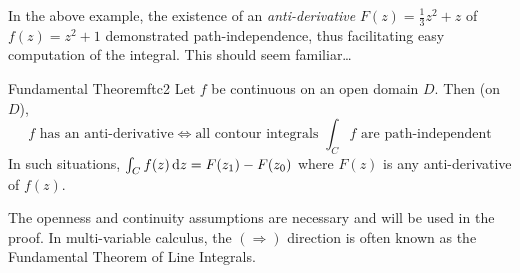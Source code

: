 \goodbreak


In the above example, the existence of an \emph{anti-derivative} $F(z)=\frac 13z^2+z$ of $f(z)=z^2+1$ demonstrated path-independence, thus facilitating easy computation of the integral. This should seem familiar\ldots 

\begin{thm}{Fundamental Theorem}{ftc2}
	Let $f$ be continuous on an open domain $D$. Then (on $D$),
	\[
		\text{$f$ has an anti-derivative} \iff \text{all contour integrals $\textstyle\int_Cf$ are path-independent}
	\]
	In such situations, $\int_Cf(z)\,{\mathrm{d} z}=F(z_1)-F(z_0)$ where $F(z)$ is any anti-derivative of $f(z)$.
\end{thm}

The openness and continuity assumptions are necessary and will be used in the proof. In multi-variable calculus, the $(\Rightarrow)$ direction is often known as the Fundamental Theorem of Line Integrals.

% 
% 
% 

% 


